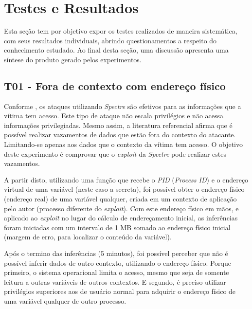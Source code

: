 \documentclass[
	article,			    %
	12pt,				    %
	oneside,			    %
	a4paper,			    %
	chapter=TITLE,		    %
	section=TITLE,		    %
	subsection=TITLE,	    %
	english,			    %
	brazil,				    %
	sumario=tradicional
]{abntex2}
\begin{document}
\section{Testes e Resultados}
Esta seção tem por objetivo expor os testes realizados de maneira sistemática, com seus resultados individuais, abrindo questionamentos a respeito do conhecimento estudado. Ao final desta seção, uma discussão apresenta uma síntese do produto gerado pelos experimentos.
\subsection{T01 - Fora de contexto com endereço físico}
Conforme , os ataques utilizando \emph{Spectre} são efetivos para as informações que a vítima tem acesso. Este tipo de ataque não escala privilégios e não acessa informações privilegiadas. Mesmo assim, a literatura referencial afirma que é possível realizar vazamentos de dados que estão fora do contexto do atacante. Limitando-se apenas aos dados que o contexto da vítima tem acesso. O objetivo deste experimento é comprovar que o \emph{exploit} da \emph{Spectre} pode realizar estes vazamentos.

A partir disto, utilizando uma função que recebe o \emph{PID} (\emph{Process ID}) e o endereço virtual de uma variável (neste caso a secreta), foi possível obter o endereço físico (endereço real) de uma variável qualquer, criada em um contexto de aplicação pelo autor (processo diferente do \emph{exploit}). Com este endereço físico em mãos, e aplicado ao \emph{exploit} no lugar do cálculo de endereçamento inicial, as inferências foram iniciadas com um intervalo de 1 MB somado ao endereço físico inicial (margem de erro, para localizar o conteúdo da variável).

Após o termino das inferências (5 minutos), foi possível perceber que não é possível inferir dados de outro contexto, utilizando o endereço físico. Porque primeiro, o sistema operacional limita o acesso, mesmo que seja de somente leitura a outras variáveis de outros contextos. E segundo, é preciso utilizar privilégios superiores aos de usuário normal para adquirir o endereço físico de uma variável qualquer de outro processo.

\begin{comment}
https://www.eqware.net/articles/CapturingProcessMemoryUsageUnderLinux/index.html
https://stackoverflow.com/questions/5748492/is-there-any-api-for-determining-the-physical-address-from-virtual-address-in-li/45128487#45128487
\end{comment}
\end{document}
